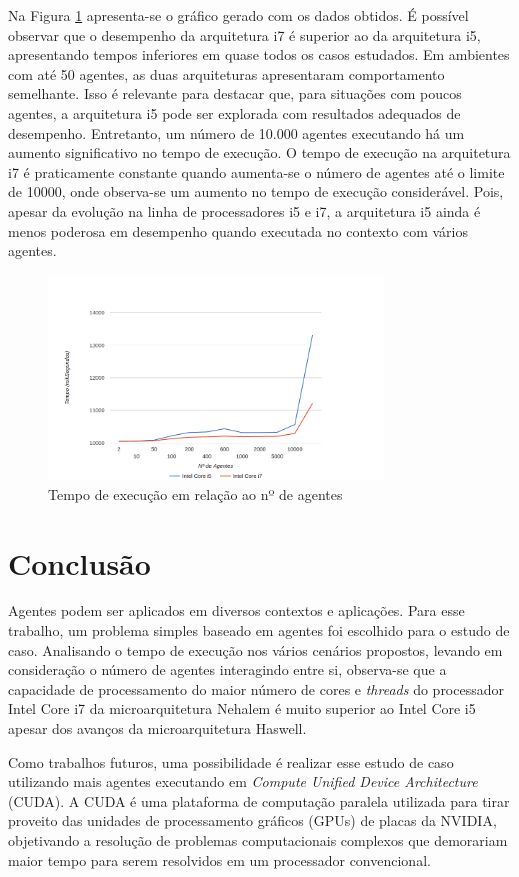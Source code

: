 \documentclass[conference]{IEEEtran}
\begin{document}
        Na Figura \ref{grafico} apresenta-se o gráfico gerado com os dados obtidos. É possível observar que o desempenho da arquitetura i7 é superior ao da arquitetura i5, apresentando tempos inferiores em quase todos os casos estudados. Em ambientes com até 50 agentes, as duas arquiteturas apresentaram comportamento semelhante. Isso é relevante para destacar que, para situações com poucos agentes, a arquitetura i5 pode ser explorada com resultados adequados de desempenho. Entretanto, um número de 10.000 agentes executando há um aumento significativo no tempo de execução. O tempo de execução na arquitetura i7 é praticamente constante quando aumenta-se o número de agentes até o limite de 10000, onde observa-se um aumento no tempo de execução considerável. Pois, apesar da evolução na linha de processadores i5 e i7, a arquitetura i5 ainda é menos poderosa em desempenho quando executada no contexto com vários agentes.
        
        \begin{figure}[ht]
        \centering
        \includegraphics[width=3.5in]{grafico.png}
        \caption{Tempo de execução em relação ao nº de agentes}
        \label{grafico}
        \end{figure}
        
        
    \section{Conclusão}

        Agentes podem ser aplicados em diversos contextos e aplicações. Para esse trabalho, um problema simples baseado em agentes foi escolhido para o estudo de caso.  Analisando o tempo de execução nos vários cenários propostos, levando em consideração o número de agentes interagindo entre si, observa-se que a capacidade de processamento do maior número de cores e \textit{threads} do processador Intel Core i7 da microarquitetura Nehalem é muito superior ao Intel Core i5 apesar dos avanços da microarquitetura Haswell. \par
        Como trabalhos futuros, uma possibilidade é realizar esse estudo de caso utilizando mais agentes executando em \textit{Compute Unified Device Architecture} (CUDA). A CUDA é uma plataforma de computação paralela utilizada para tirar proveito das unidades de processamento gráficos (GPUs) de placas da NVIDIA, objetivando a resolução de problemas computacionais complexos que demorariam maior tempo para serem resolvidos em um processador convencional.        
\end{document}

